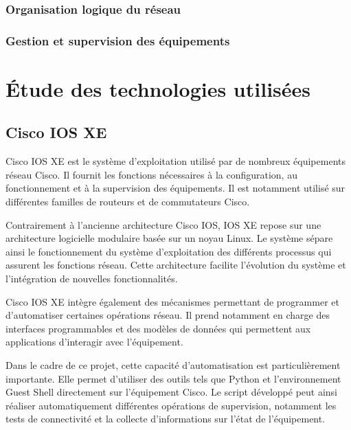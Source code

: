 \documentclass[12pt, a4paper, oneside]{report}
\begin{document}
\subsection{Organisation logique du réseau}
\subsection{Gestion et supervision des équipements}

\chapter{Étude des technologies utilisées}
\section{Cisco IOS XE}

Cisco IOS XE est le système d'exploitation utilisé par de nombreux équipements réseau Cisco. 
Il fournit les fonctions nécessaires à la configuration, au fonctionnement et à la supervision des équipements. 
Il est notamment utilisé sur différentes familles de routeurs et de commutateurs Cisco.

Contrairement à l'ancienne architecture Cisco IOS, IOS XE repose sur une architecture logicielle 
modulaire basée sur un noyau Linux. Le système sépare ainsi le fonctionnement du système d'exploitation 
des différents processus qui assurent les fonctions réseau. Cette architecture facilite l'évolution 
du système et l'intégration de nouvelles fonctionnalités.

Cisco IOS XE intègre également des mécanismes permettant de programmer et d'automatiser certaines 
opérations réseau. Il prend notamment en charge des interfaces programmables et des modèles de 
données qui permettent aux applications d'interagir avec l'équipement.

Dans le cadre de ce projet, cette capacité d'automatisation est particulièrement importante. 
Elle permet d'utiliser des outils tels que Python et l'environnement Guest Shell directement 
sur l'équipement Cisco. Le script développé peut ainsi réaliser automatiquement différentes 
opérations de supervision, notamment les tests de connectivité et la collecte d'informations 
sur l'état de l'équipement.
\end{document}
